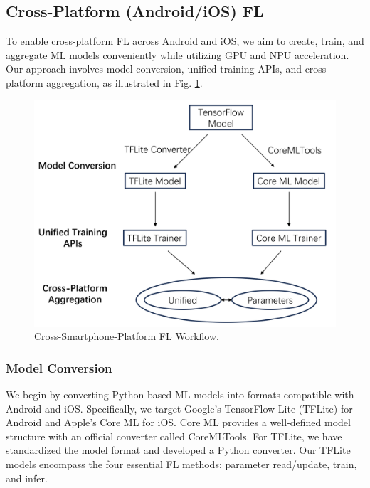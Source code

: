 \documentclass[letterpaper]{article} %
\begin{document}
\subsection{Cross-Platform (Android/iOS) FL}

To enable cross-platform FL across Android and iOS,
we aim to create, train, and aggregate ML models conveniently while
utilizing GPU and NPU acceleration.
Our approach involves model conversion, unified training APIs,
and cross-platform aggregation,
as illustrated in Fig. \ref{cross_fl}.

\begin{figure}
    \centering
    \includegraphics*[width=\linewidth]{cross_smart_fl_workflow.pdf}
    \caption{Cross-Smartphone-Platform FL Workflow.}
    \label{cross_fl}
\end{figure}

\subsubsection{Model Conversion}
We begin by converting Python-based ML models into formats compatible with
Android and iOS.
Specifically, we target Google's TensorFlow Lite (TFLite) for Android and
Apple's Core ML for iOS.
Core ML provides a well-defined model structure with
an official converter called CoreMLTools.
For TFLite, we have standardized the model format and
developed a Python converter.
Our TFLite models encompass the four essential FL methods:
parameter read/update, train, and infer.
\end{document}
